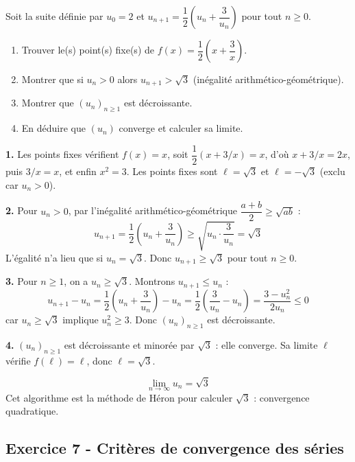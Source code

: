 \documentclass[12pt,a4paper]{article}
\begin{document}
\begin{boiteexercice}
Soit la suite définie par $u_0 = 2$ et $u_{n+1} = \dfrac{1}{2}\left(u_n + \dfrac{3}{u_n}\right)$ pour tout $n\geq0$.
\begin{enumerate}
  \item Trouver le(s) point(s) fixe(s) de $f(x) = \dfrac{1}{2}\left(x + \dfrac{3}{x}\right)$.
  \item Montrer que si $u_n > 0$ alors $u_{n+1} > \sqrt{3}$
  (inégalité arithmético-géométrique).
  \item Montrer que $(u_n)_{n\geq1}$ est décroissante.
  \item En déduire que $(u_n)$ converge et calculer sa limite.
\end{enumerate}
\end{boiteexercice}

\begin{boitecorrige}
\textbf{1.} Les points fixes vérifient $f(x) = x$, soit $\dfrac{1}{2}(x+3/x) = x$, d'où $x+3/x = 2x$, puis $3/x = x$, et enfin $x^2 = 3$. Les points fixes sont $\ell = \sqrt{3}$ et $\ell = -\sqrt{3}$ (exclu car $u_n > 0$).

\textbf{2.} Pour $u_n > 0$, par l'inégalité arithmético-géométrique $\dfrac{a+b}{2} \geq \sqrt{ab}$ :
\[
u_{n+1} = \frac{1}{2}\!\left(u_n + \frac{3}{u_n}\right) \geq \sqrt{u_n\cdot\frac{3}{u_n}} = \sqrt{3}
\]
L'égalité n'a lieu que si $u_n = \sqrt{3}$. Donc $u_{n+1} \geq \sqrt{3}$ pour tout $n\geq0$.

\textbf{3.} Pour $n\geq1$, on a $u_n \geq \sqrt{3}$. Montrons $u_{n+1} \leq u_n$ :
\[
u_{n+1} - u_n = \frac{1}{2}\!\left(u_n+\frac{3}{u_n}\right) - u_n = \frac{1}{2}\!\left(\frac{3}{u_n}-u_n\right) = \frac{3-u_n^2}{2u_n} \leq 0
\]
car $u_n \geq \sqrt{3}$ implique $u_n^2 \geq 3$. Donc $(u_n)_{n\geq1}$ est décroissante.

\textbf{4.} $(u_n)_{n\geq1}$ est décroissante et minorée par $\sqrt{3}$ : elle converge. Sa limite $\ell$ vérifie $f(\ell) = \ell$, donc $\ell = \sqrt{3}$.

\[
\boxed{\lim_{n\to\infty} u_n = \sqrt{3}}
\]
Cet algorithme est la méthode de Héron pour calculer $\sqrt{3}$ : convergence quadratique.
\end{boitecorrige}

\subsection*{Exercice 7 - Critères de convergence des séries \niveau{\moyen}}
\end{document}
